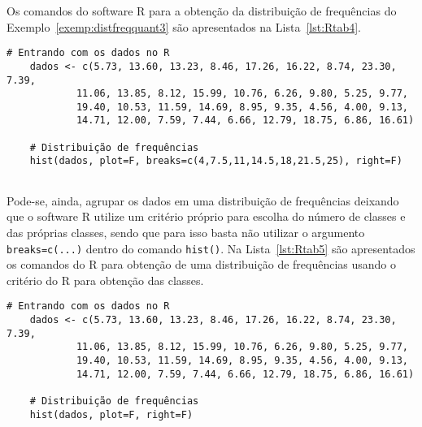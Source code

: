 \documentclass[11pt,fleqn]{book} %
\begin{document}
Os comandos do software R para a obtenção da distribuição de frequências do Exemplo~\ref{exemp:distfreqquant3} são apresentados na Lista~\ref{lst:Rtab4}. \\


\begin{scriptsize}
	\estiloR
	\begin{lstlisting}[caption={Comandos do software R}, label=lst:Rtab4]
	# Entrando com os dados no R
	dados <- c(5.73, 13.60, 13.23, 8.46, 17.26, 16.22, 8.74, 23.30, 7.39,
			11.06, 13.85, 8.12, 15.99, 10.76, 6.26, 9.80, 5.25, 9.77,
			19.40, 10.53, 11.59, 14.69, 8.95, 9.35, 4.56, 4.00, 9.13,
			14.71, 12.00, 7.59, 7.44, 6.66, 12.79, 18.75, 6.86, 16.61)
	
	# Distribuição de frequências
	hist(dados, plot=F, breaks=c(4,7.5,11,14.5,18,21.5,25), right=F)
	
	\end{lstlisting}
\end{scriptsize}


Pode-se, ainda, agrupar os dados em uma distribuição de frequências deixando que o software R utilize um critério próprio para escolha do número de classes e das próprias classes, sendo que para isso basta não utilizar o argumento \texttt{breaks=c(...)} dentro do comando \texttt{hist()}. Na Lista~\ref{lst:Rtab5} são apresentados os comandos do R para obtenção de uma distribuição de frequências usando o critério do R para obtenção das classes. \\


\begin{scriptsize}
	\estiloR
	\begin{lstlisting}[caption={Comandos do software R}, label=lst:Rtab5]
	# Entrando com os dados no R
	dados <- c(5.73, 13.60, 13.23, 8.46, 17.26, 16.22, 8.74, 23.30, 7.39,
			11.06, 13.85, 8.12, 15.99, 10.76, 6.26, 9.80, 5.25, 9.77,
			19.40, 10.53, 11.59, 14.69, 8.95, 9.35, 4.56, 4.00, 9.13,
			14.71, 12.00, 7.59, 7.44, 6.66, 12.79, 18.75, 6.86, 16.61)
	
	# Distribuição de frequências
	hist(dados, plot=F, right=F)
	
	\end{lstlisting}
\end{scriptsize}



\end{document}
